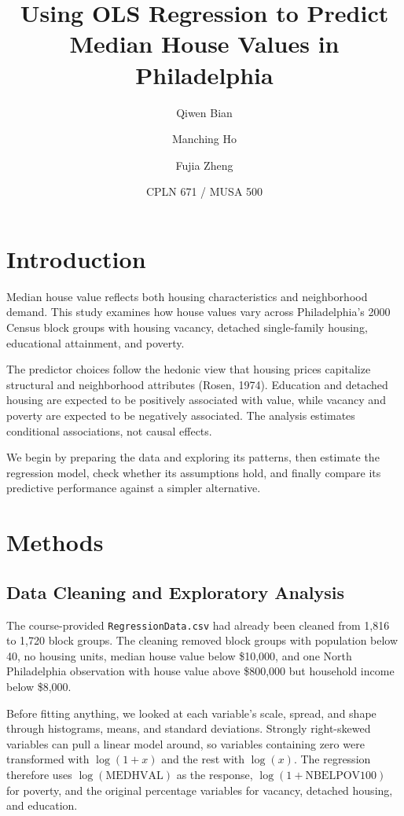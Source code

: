 \documentclass[11pt]{article}
\title{\vspace{-1.1cm}\textbf{Using OLS Regression to Predict\\Median House Values in Philadelphia}}
\author{Qiwen Bian \and Manching Ho \and Fujia Zheng}
\date{CPLN 671 / MUSA 500}
\newcommand{\var}[1]{\texttt{#1}}
\begin{document}
\maketitle
\thispagestyle{fancy}

\section{Introduction}

Median house value reflects both housing characteristics and neighborhood demand. This study examines how house values vary across Philadelphia's 2000 Census block groups with housing vacancy, detached single-family housing, educational attainment, and poverty.

The predictor choices follow the hedonic view that housing prices capitalize structural and neighborhood attributes (Rosen, 1974). Education and detached housing are expected to be positively associated with value, while vacancy and poverty are expected to be negatively associated. The analysis estimates conditional associations, not causal effects.

We begin by preparing the data and exploring its patterns, then estimate the regression model, check whether its assumptions hold, and finally compare its predictive performance against a simpler alternative.

\section{Methods}

\subsection{Data Cleaning and Exploratory Analysis}

The course-provided \var{RegressionData.csv} had already been cleaned from 1,816 to 1,720 block groups. The cleaning removed block groups with population below 40, no housing units, median house value below \$10,000, and one North Philadelphia observation with house value above \$800,000 but household income below \$8,000.

Before fitting anything, we looked at each variable's scale, spread, and shape through histograms, means, and standard deviations. Strongly right-skewed variables can pull a linear model around, so variables containing zero were transformed with $\log(1+x)$ and the rest with $\log(x)$. The regression therefore uses $\log(\mathrm{MEDHVAL})$ as the response, $\log(1+\mathrm{NBELPOV100})$ for poverty, and the original percentage variables for vacancy, detached housing, and education.
\end{document}
